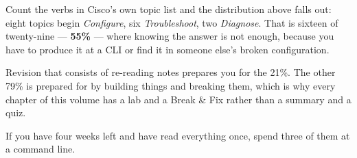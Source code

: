 \begin{examnote}
Count the verbs in Cisco's own topic list and the distribution above falls out:
eight topics begin \emph{Configure}, six \emph{Troubleshoot}, two
\emph{Diagnose}. That is sixteen of twenty-nine --- \textbf{55\%} --- where
knowing the answer is not enough, because you have to produce it at a CLI or find
it in someone else's broken configuration.

Revision that consists of re-reading notes prepares you for the 21\%. The other
79\% is prepared for by building things and breaking them, which is why every
chapter of this volume has a lab and a Break \& Fix rather than a summary and a
quiz.

If you have four weeks left and have read everything once, spend three of them at
a command line.
\end{examnote}
